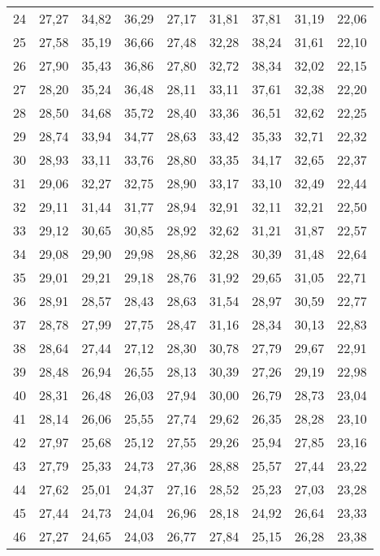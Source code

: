 \begin{longtable}{c c c c c c c c c}
      24	& 27,27	& 34,82	& 36,29	& 27,17	& 31,81	& 37,81	& 31,19	& 22,06 \\
      25	& 27,58	& 35,19	& 36,66	& 27,48	& 32,28	& 38,24	& 31,61	& 22,10 \\
      26	& 27,90	& 35,43	& 36,86	& 27,80	& 32,72	& 38,34	& 32,02	& 22,15 \\
      27	& 28,20	& 35,24	& 36,48	& 28,11	& 33,11	& 37,61	& 32,38	& 22,20 \\
      28	& 28,50	& 34,68	& 35,72	& 28,40	& 33,36	& 36,51	& 32,62	& 22,25 \\
      29	& 28,74	& 33,94	& 34,77	& 28,63	& 33,42	& 35,33	& 32,71	& 22,32 \\
      30	& 28,93	& 33,11	& 33,76	& 28,80	& 33,35	& 34,17	& 32,65	& 22,37 \\
      31	& 29,06	& 32,27	& 32,75	& 28,90	& 33,17	& 33,10	& 32,49	& 22,44 \\
      32	& 29,11	& 31,44	& 31,77	& 28,94	& 32,91	& 32,11	& 32,21	& 22,50 \\
      33	& 29,12	& 30,65	& 30,85	& 28,92	& 32,62	& 31,21	& 31,87	& 22,57 \\
      34	& 29,08	& 29,90	& 29,98	& 28,86	& 32,28	& 30,39	& 31,48	& 22,64 \\
      35	& 29,01	& 29,21	& 29,18	& 28,76	& 31,92	& 29,65	& 31,05	& 22,71 \\
      36	& 28,91	& 28,57	& 28,43	& 28,63	& 31,54	& 28,97	& 30,59	& 22,77 \\
      37	& 28,78	& 27,99	& 27,75	& 28,47	& 31,16	& 28,34	& 30,13	& 22,83 \\
      38	& 28,64	& 27,44	& 27,12	& 28,30	& 30,78	& 27,79	& 29,67	& 22,91 \\
      39	& 28,48	& 26,94	& 26,55	& 28,13	& 30,39	& 27,26	& 29,19	& 22,98 \\
      40	& 28,31	& 26,48	& 26,03	& 27,94	& 30,00	& 26,79	& 28,73	& 23,04 \\
      41	& 28,14	& 26,06	& 25,55	& 27,74	& 29,62	& 26,35	& 28,28	& 23,10 \\
      42	& 27,97	& 25,68	& 25,12	& 27,55	& 29,26	& 25,94	& 27,85	& 23,16 \\
      43	& 27,79	& 25,33	& 24,73	& 27,36	& 28,88	& 25,57	& 27,44	& 23,22 \\
      44	& 27,62	& 25,01	& 24,37	& 27,16	& 28,52	& 25,23	& 27,03	& 23,28 \\
      45	& 27,44	& 24,73	& 24,04	& 26,96	& 28,18	& 24,92	& 26,64	& 23,33 \\
      46	& 27,27	& 24,65	& 24,03	& 26,77	& 27,84	& 25,15	& 26,28	& 23,38 \\

\end{longtable}
